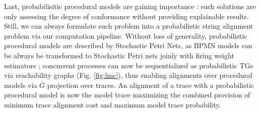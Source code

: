  
Last, probabilisitic procedural models are gaining importance \cite{DBLP:conf/icpm/PolyvyanyyK19}: such solutions are only assessing the degree of conformance without providing explainable results. Still, we can always formulate such problem into a probabilistic string alignment problem via our computation pipeline.
Without loss of generality, probabilistic procedural models are described by Stochastic Petri Nets, as BPMN models can be always be transformed to Stochastic Petri nets \cite{RaedtsPUWGS07} joinly with firing weight estimators \cite{spdwe}; concurrent processes can now be sequentialized as probabilistic TGs via reachability graphs (Fig. \ref{fig:lmc}), thus enabling  alignments over procedural models via $\overline{G}$ projection over traces. An alignment of a trace with a probabilistic procedural model is now the model trace maximizing the combined provision of minimum trace alignment cost and maximum model trace probability. 
 







